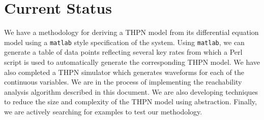 \documentclass[11pt,times]{article}
\begin{document}

\section{Current Status}

We have a methodology for deriving a THPN model from its differential 
equation model using a {\tt matlab} style specification of the system.  Using
{\tt matlab}, we can generate a table of data points reflecting several key
rates from which a Perl script is used to automatically generate the 
corresponding THPN model.  We have also completed a THPN simulator which
generates waveforms for each of the continuous variables.  We are in the 
process of implementing the reachability analysis algorithm described in this 
document.  We are also developing techniques to reduce the size and complexity
of the THPN model using abstraction.  Finally, we are actively searching for 
examples to test our methodology.



\end{document}
